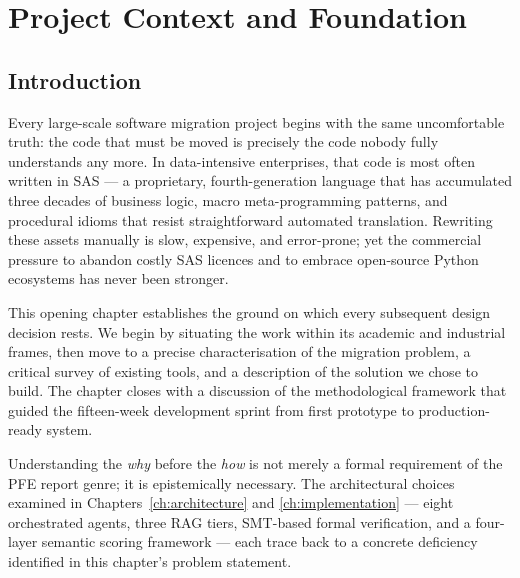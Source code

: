 
\chapter{Project Context and Foundation}
\label{ch:context}

\section{Introduction}
\label{sec:ch1-intro}

Every large-scale software migration project begins with the same uncomfortable
truth: the code that must be moved is precisely the code nobody fully
understands any more. In data-intensive enterprises, that code is most often
written in \ac{SAS} --- a proprietary, fourth-generation language that has
accumulated three decades of business logic, macro meta-programming patterns,
and procedural idioms that resist straightforward automated translation.
Rewriting these assets manually is slow, expensive, and error-prone; yet the
commercial pressure to abandon costly SAS licences and to embrace open-source
Python ecosystems has never been stronger.

This opening chapter establishes the ground on which every subsequent design
decision rests. We begin by situating the work within its academic and
industrial frames, then move to a precise characterisation of the migration
problem, a critical survey of existing tools, and a description of the solution
we chose to build. The chapter closes with a discussion of the methodological
framework that guided the fifteen-week development sprint from first prototype
to production-ready system.

Understanding the \emph{why} before the \emph{how} is not merely a formal
requirement of the PFE report genre; it is epistemically necessary. The
architectural choices examined in Chapters~\ref{ch:architecture} and
\ref{ch:implementation} --- eight orchestrated agents, three \ac{RAG} tiers,
\ac{SMT}-based formal verification, and a four-layer semantic scoring framework
--- each trace back to a concrete deficiency identified in this chapter's
problem statement.

